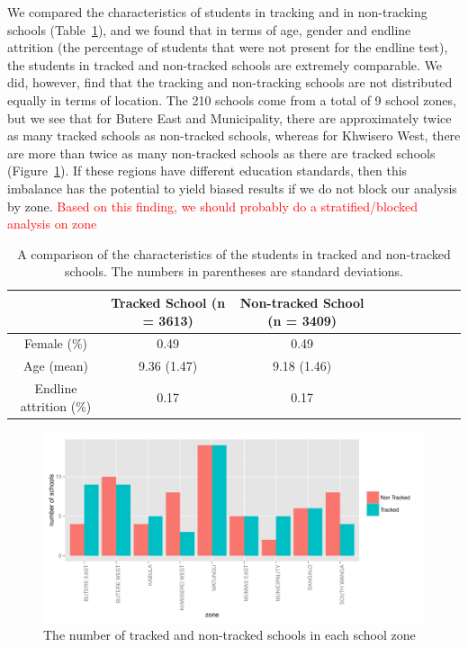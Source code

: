 \documentclass[11pt]{article}
\begin{document}
 We compared the characteristics of students in tracking and in non-tracking schools (Table~\ref{tab:char}), and we found that in terms of age, gender and endline attrition (the percentage of students that were not present for the endline test), the students in tracked and non-tracked schools are extremely comparable. We did, however, find that the tracking and non-tracking schools are not distributed equally in terms of location. The 210 schools come from a total of 9 school zones, but we see that for Butere East and Municipality, there are approximately twice as many tracked schools as non-tracked schools, whereas for Khwisero West, there are more than twice as many non-tracked schools as there are tracked schools (Figure~\ref{fig:zone}). If these regions have different education standards, then this imbalance has the potential to yield biased results if we do not block our analysis by zone. \textcolor{red}{Based on this finding, we should probably do a stratified/blocked analysis on zone}
 
 
 \begin{table}[H]
 \centering
 \begin{tabular}{cccccccccc}
 \hline
 & Tracked School (n = 3613) & Non-tracked School (n = 3409)\\
 \hline
Female (\%) & 0.49 & 0.49\\
Age (mean) & 9.36 (1.47) & 9.18 (1.46)\\
Endline attrition (\%) & 0.17 & 0.17\\ \hline
 \end{tabular}
 \caption{A comparison of the characteristics of the students in tracked and non-tracked schools. The numbers in parentheses are standard deviations.}
 \label{tab:char}
 \end{table} 
 
 \begin{figure}[H]
 \centering
 \includegraphics[scale = 0.5]{school_zones.pdf}
 \caption{The number of tracked and non-tracked schools in each school zone}
 \label{fig:zone}
 \end{figure}
 
\end{document}
